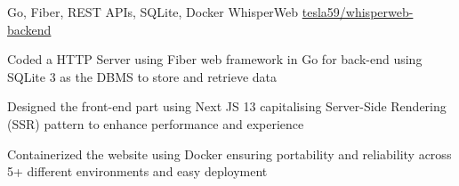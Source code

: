 \documentclass[]{awesome-cv}
\begin{document}
\begin{cventries}
    \vspace{-4mm}
    \cventry
    {Go, Fiber, REST APIs, SQLite, Docker}
    {WhisperWeb}
    {\href{https://github.com/tesla59/whisperweb-backend}{tesla59/whisperweb-backend}}
    {}
    {\begin{cvitems}
            \item Coded a HTTP Server using Fiber web framework in Go for back-end using SQLite 3 as the DBMS to store and retrieve data
            \item Designed the front-end part using Next JS 13 capitalising Server-Side Rendering (SSR) pattern to enhance performance and experience
            \item Containerized the website using Docker ensuring portability and reliability across 5+ different environments and easy deployment
        \end{cvitems}}




    \vspace{-7mm}
\end{cventries}
\end{document}

